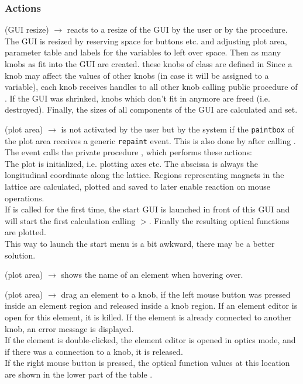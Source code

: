 \documentclass[12pt]{article}
\newcommand\code[1]{{\tt #1}}
\newcommand{\ofldx}[1]{\colorbox{black!15}{(#1)}}
\newcommand\guico[1]{{\color{blue}\code{#1}}}
\newcommand\guifco[1]{{\color{violet}\code{#1}}}
\newcommand{\unico}[1]{{\color{burntorange}\code{#1}}}
\newcommand{\evcodx}[2]{\ofldx{#1} $\rightarrow$ \guico{#2}}
\newcommand{\prcod}[2]{\opauni{#1}$>$\unico{#2}}
\newcommand{\opagui}[1]{\colorbox{blue!20}{{\color{black}\code{#1}}}}
\newcommand{\ogui}[1]{\hyperref[#1]{\opagui{#1}}}
\newcommand{\opaguif}[1]{\colorbox{violet!30}{{\color{black}\code{#1}}}}
\newcommand{\oguif}[1]{\hyperref[#1]{\opaguif{#1}}}
\newcommand{\opauni}[1]{\colorbox{orange!30}{{\color{black}\code{#1}}}}
\newcommand{\act}[1]{\subsubsection*{Actions} #1}
\newcommand{\todo}[1]{{\color{red} #1}}
\begin{document}
\act{
\evcodx{GUI resize}{FormResize} reacts to a resize of the GUI by the user or by the \guico{Init} procedure. The GUI is resized by reserving space for buttons etc. and adjusting plot area, parameter table and labels for the variables to left over space.
Then as many knobs as fit into the GUI are created. these knobs of class 
\guifco{TKnob} are defined in   Since a knob may affect the values of other knobs (in case it will be assigned to a variable), each knob receives handles to all other knob calling public procedure \guifco{BrotherHandles} of \oguif{knobframe}. If the GUI was shrinked, knobs which don't fit in anymore are freed (i.e. destroyed). Finally, the sizes of all components of the GUI are calculated and set.

\evcodx{plot area}{pwpaint} is not activated by the user but by the system if the \code{paintbox} of the plot area receives a generic \code{repaint} event. This is also done by \ogui{opamenu} after calling \guico{Init}. The event calls the private procedure \guico{MakePlot}, which performs these actions:\\
The plot is initialized, i.e. plotting axes etc. The abscissa is always the longitudinal coordinate along the lattice. Regions representing magnets in the lattice are calculated, plotted and saved to later enable reaction on mouse operations.\\
If \guico{MakePlot} is called for the first time, the start GUI \ogui{ostartmenu} is launched in front of this GUI and will start the first calculation calling \prcod{linoplib}{OpticCalc}. Finally the resulting optical functions are plotted.\\ \todo{This way to launch the start menu is a bit awkward, there may be a better solution.}

\evcodx{plot area}{pwMouseMove} shows the name of an element when hovering over.

\evcodx{plot area}{pwMouseDown, pwMouseUp} drag an element to a knob, if the left mouse button was pressed inside an element region and released inside a knob region. If an element editor \ogui{oeleedit} is open for this element, it is killed. If the element is already connected to another knob, an error message is displayed.\\
If the element is double-clicked, the element editor \ogui{oeleedit} is opened in optics mode, and if there was a connection to a knob, it is released.\\
If the right mouse button is pressed, the optical function values at this location are shown in the lower part of the table \guico{tab}.

}
\end{document}
